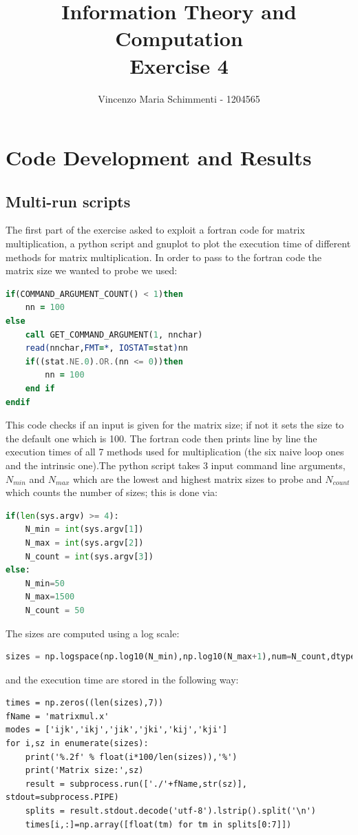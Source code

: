 \documentclass{article}
\title{%
	Information Theory and Computation \\
	Exercise  4}
\author{Vincenzo Maria Schimmenti - 1204565}
\begin{document}
\maketitle
 
\section*{Code Development and Results}
\subsection*{Multi-run scripts}
The first part of the exercise asked to exploit a fortran code for matrix multiplication, a python script and gnuplot to plot the execution time of different methods for matrix multiplication. In order to pass to the fortran code the matrix size we wanted to probe we used:
\begin{lstlisting}[language=Fortran]
if(COMMAND_ARGUMENT_COUNT() < 1)then
	nn = 100
else
	call GET_COMMAND_ARGUMENT(1, nnchar)
	read(nnchar,FMT=*, IOSTAT=stat)nn
	if((stat.NE.0).OR.(nn <= 0))then
		nn = 100
	end if	
endif
\end{lstlisting}
This code checks if an input is given for the matrix size; if not it sets the size to the default one which is 100. The fortran code then prints line by line the execution times of all 7 methods used for multiplication (the six naive loop ones and the intrinsic one).The python script takes 3 input command line arguments, $N_{min}$ and $N_{max}$ which are the lowest and highest matrix sizes to probe and $N_{count}$ which counts the number of sizes; this is done via:
\begin{lstlisting}[language=Python]
if(len(sys.argv) >= 4):
	N_min = int(sys.argv[1])
	N_max = int(sys.argv[2])
	N_count = int(sys.argv[3])
else:
	N_min=50
	N_max=1500
	N_count = 50
\end{lstlisting}
The sizes are computed using a log scale:
\begin{lstlisting}[language=Python]
sizes = np.logspace(np.log10(N_min),np.log10(N_max+1),num=N_count,dtype=int)
\end{lstlisting}
and the execution time are stored in the following way:
\begin{lstlisting}
times = np.zeros((len(sizes),7))
fName = 'matrixmul.x'
modes = ['ijk','ikj','jik','jki','kij','kji']
for i,sz in enumerate(sizes):
	print('%.2f' % float(i*100/len(sizes)),'%')
	print('Matrix size:',sz)
	result = subprocess.run(['./'+fName,str(sz)], stdout=subprocess.PIPE)
	splits = result.stdout.decode('utf-8').lstrip().split('\n')
	times[i,:]=np.array([float(tm) for tm in splits[0:7]])
\end{lstlisting}
\end{document}
